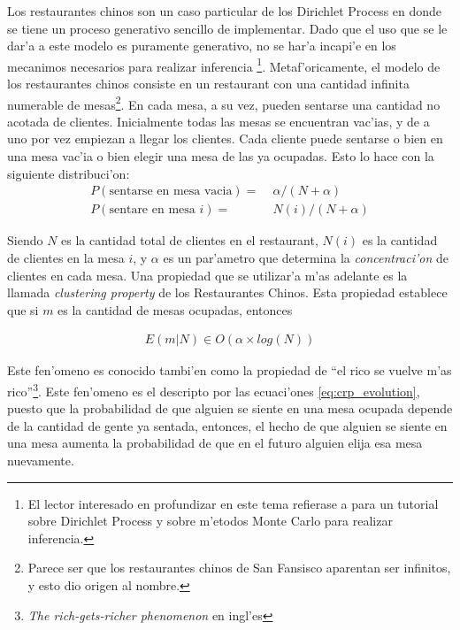 Los restaurantes chinos son un caso particular de los Dirichlet Process en donde se tiene un proceso generativo sencillo de implementar.
Dado que el uso que se le dar'a a este modelo es puramente generativo, no se har'a incapi'e en los mecanimos necesarios para realizar inferencia
\footnote{El lector interesado en profundizar en este tema refierase a \cite{Teh2007} para un tutorial sobre Dirichlet Process y \cite{neal2000markov} sobre m'etodos Monte Carlo para realizar inferencia.}.
Metaf'oricamente, el modelo de los restaurantes chinos consiste en un restaurant con una cantidad infinita numerable de mesas\footnote{Parece ser que los restaurantes chinos de San Fansisco aparentan ser infinitos, y esto dio origen al nombre.}. 
En cada mesa, a su vez, pueden sentarse una cantidad no acotada de clientes. Inicialmente todas las mesas se encuentran vac'ias, 
y de a uno por vez empiezan a llegar los clientes. Cada cliente puede sentarse o bien en una mesa vac'ia o bien elegir una mesa de las ya ocupadas. 
Esto lo hace con la siguiente distribuci'on:
\begin{align}
\label{eq:crp_evolution}
P(\text{sentarse en mesa vacia}) =&\; \alpha/(N + \alpha)\\
P(\text{sentare en mesa } i) =&\; N(i)/(N + \alpha)
\end{align}

Siendo $N$ es la cantidad total de clientes en el restaurant, $N(i)$ es la cantidad de clientes en la mesa $i$, y $\alpha$ es un 
par'ametro que determina la \emph{concentraci'on} de clientes en cada mesa. Una propiedad que se utilizar'a m'as adelante es la llamada \emph{clustering property} de los Restaurantes Chinos.
Esta propiedad establece que si $m$ es la cantidad de mesas ocupadas, entonces

\begin{align}
\label{eq:crp_clustering}
E(m|N) \in O(\alpha\times log(N))
\end{align}

Este fen'omeno es conocido tambi'en como la propiedad de ``el rico se vuelve m'as rico''\footnote{\emph{The rich-gets-richer phenomenon} en ingl'es}. Este fen'omeno es el descripto por
las ecuaci'ones \ref{eq:crp_evolution}, puesto que la probabilidad de que alguien se siente en una mesa ocupada depende de la cantidad de gente ya sentada, entonces, el hecho
de que alguien se siente en una mesa aumenta la probabilidad de que en el futuro alguien elija esa mesa nuevamente.

